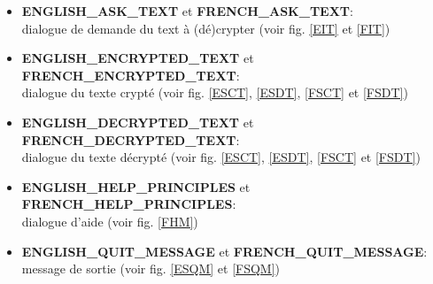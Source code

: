 \documentclass[a4paper,12pt,abstracton,titlepage]{scrartcl}
\begin{document}
\begin{itemize}
\begin{itemize}
\item \textbf{ENGLISH\_ASK\_TEXT} et \textbf{FRENCH\_ASK\_TEXT}:\\
dialogue de demande du text à (dé)crypter (voir fig. \ref{EIT} et \ref{FIT})\\
\item \textbf{ENGLISH\_ENCRYPTED\_TEXT} et \textbf{FRENCH\_ENCRYPTED\_TEXT}:\\
dialogue du texte crypté (voir fig. \ref{ESCT}, \ref{ESDT}, \ref{FSCT} et \ref{FSDT})\\
\item \textbf{ENGLISH\_DECRYPTED\_TEXT} et \textbf{FRENCH\_DECRYPTED\_TEXT}:\\
dialogue du texte décrypté (voir fig. \ref{ESCT}, \ref{ESDT}, \ref{FSCT} et \ref{FSDT})\\
\item \textbf{ENGLISH\_HELP\_PRINCIPLES} et \textbf{FRENCH\_HELP\_PRINCIPLES}:\\
dialogue d'aide (voir fig. \ref{FHM})\\
\item \textbf{ENGLISH\_QUIT\_MESSAGE} et \textbf{FRENCH\_QUIT\_MESSAGE}:\\
message de sortie (voir fig. \ref{ESQM} et \ref{FSQM})\\
\end{itemize}\vspace{0.3cm}


\end{itemize}
\end{document}
